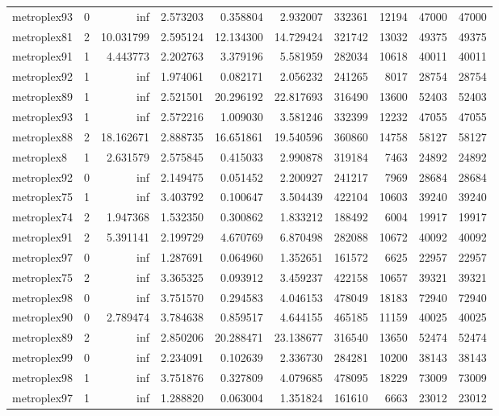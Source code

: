 \begin{longtable}{|l|r|r|r|r|r|r|r|r|r|}
metroplex93 & 0 & inf & 2.573203 & 0.358804 & 2.932007 & 332361 & 12194 & 47000 & 47000 \\
metroplex81 & 2 & 10.031799 & 2.595124 & 12.134300 & 14.729424 & 321742 & 13032 & 49375 & 49375 \\
metroplex91 & 1 & 4.443773 & 2.202763 & 3.379196 & 5.581959 & 282034 & 10618 & 40011 & 40011 \\
metroplex92 & 1 & inf & 1.974061 & 0.082171 & 2.056232 & 241265 & 8017 & 28754 & 28754 \\
metroplex89 & 1 & inf & 2.521501 & 20.296192 & 22.817693 & 316490 & 13600 & 52403 & 52403 \\
metroplex93 & 1 & inf & 2.572216 & 1.009030 & 3.581246 & 332399 & 12232 & 47055 & 47055 \\
metroplex88 & 2 & 18.162671 & 2.888735 & 16.651861 & 19.540596 & 360860 & 14758 & 58127 & 58127 \\
metroplex8 & 1 & 2.631579 & 2.575845 & 0.415033 & 2.990878 & 319184 & 7463 & 24892 & 24892 \\
metroplex92 & 0 & inf & 2.149475 & 0.051452 & 2.200927 & 241217 & 7969 & 28684 & 28684 \\
metroplex75 & 1 & inf & 3.403792 & 0.100647 & 3.504439 & 422104 & 10603 & 39240 & 39240 \\
metroplex74 & 2 & 1.947368 & 1.532350 & 0.300862 & 1.833212 & 188492 & 6004 & 19917 & 19917 \\
metroplex91 & 2 & 5.391141 & 2.199729 & 4.670769 & 6.870498 & 282088 & 10672 & 40092 & 40092 \\
metroplex97 & 0 & inf & 1.287691 & 0.064960 & 1.352651 & 161572 & 6625 & 22957 & 22957 \\
metroplex75 & 2 & inf & 3.365325 & 0.093912 & 3.459237 & 422158 & 10657 & 39321 & 39321 \\
metroplex98 & 0 & inf & 3.751570 & 0.294583 & 4.046153 & 478049 & 18183 & 72940 & 72940 \\
metroplex90 & 0 & 2.789474 & 3.784638 & 0.859517 & 4.644155 & 465185 & 11159 & 40025 & 40025 \\
metroplex89 & 2 & inf & 2.850206 & 20.288471 & 23.138677 & 316540 & 13650 & 52474 & 52474 \\
metroplex99 & 0 & inf & 2.234091 & 0.102639 & 2.336730 & 284281 & 10200 & 38143 & 38143 \\
metroplex98 & 1 & inf & 3.751876 & 0.327809 & 4.079685 & 478095 & 18229 & 73009 & 73009 \\
metroplex97 & 1 & inf & 1.288820 & 0.063004 & 1.351824 & 161610 & 6663 & 23012 & 23012 \\

\end{longtable}
